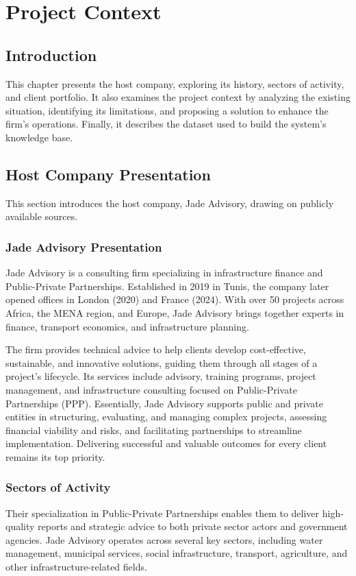 \chapter{Project Context}

\section{Introduction}
This chapter presents the host company, exploring its history, sectors of
activity, and client portfolio. It also examines the project context by
analyzing the existing situation, identifying its limitations, and proposing
a solution to enhance the firm's operations. Finally, it describes the
dataset used to build the system's knowledge base.

\section{Host Company Presentation}
This section introduces the host company, Jade Advisory, drawing on publicly available sources.

\subsection{Jade Advisory Presentation}
Jade Advisory \cite{WJade} is a consulting firm specializing in infrastructure
finance and Public-Private Partnerships. Established in 2019 in Tunis, the
company later opened offices in London (2020) and France (2024). With over
50 projects across Africa, the MENA region, and Europe, Jade Advisory brings
together experts in finance, transport economics, and infrastructure planning.

The firm provides technical advice to help clients develop cost-effective,
sustainable, and innovative solutions, guiding them through all stages of a
project's lifecycle. Its services include advisory, training programs, project
management, and infrastructure consulting focused on Public-Private Partnerships
(PPP). Essentially, Jade Advisory supports public and private entities in
structuring, evaluating, and managing complex projects, assessing financial
viability and risks, and facilitating partnerships to streamline implementation.
Delivering successful and valuable outcomes for every client remains its top
priority.

\subsection{Sectors of Activity}
Their specialization in Public-Private Partnerships enables them to deliver
high-quality reports and strategic advice to both private sector actors and
government agencies. Jade Advisory operates across several key sectors,
including water management, municipal services, social infrastructure,
transport, agriculture, and other infrastructure-related fields.

